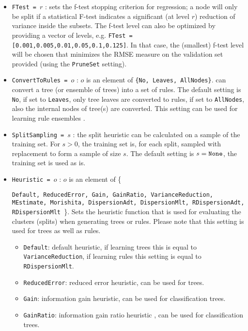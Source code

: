 \begin{itemize}
	\item {\tt FTest = $r$} : sets the f-test stopping criterion for regression; a node will only be split if a statistical F-test indicates a significant (at level $r$) reduction of variance inside the subsets. The f-test level can also be optimized by providing a vector of levels, e.g. {\tt FTest = [0.001,0.005,0.01,0.05,0.1,0.125]}. In that case, the (smallest) f-test level will be chosen that minimizes the RMSE measure on the validation set provided (using the {\tt PruneSet} setting).
	\item {\tt ConvertToRules = $o$} : $o$ is an element of \texttt{\{No, Leaves, AllNodes\}}. \clus{} can convert a tree (or ensemble of trees) into a set of rules. The default setting is \texttt{No}, if set to \texttt{Leaves}, only tree leaves are converted to rules, if set to \texttt{AllNodes}, also the internal nodes of tree(s) are converted. This setting can be used for learning rule ensembles \cite{Aho2009}.
	\item {\tt SplitSampling = $s$} : the split heuristic can be calculated on a sample of the training set. For $s > 0$, the training set is, for each split, sampled with replacement to form a sample of size $s$. The default setting is $s = {\tt None}$, the training set is used as is. 
	\item \texttt{Heuristic = $o$} : $o$ is an element of \{\raggedright\texttt{Default, ReducedError, Gain, GainRatio, %
		VarianceReduction, MEstimate, Morishita, DispersionAdt, DispersionMlt, RDispersionAdt, RDispersionMlt%
	}\}. Sets the heuristic function that is used for evaluating the clusters (splits) when generating trees or rules. Please note that this setting is used for trees as well as rules.
	\begin{itemize}
		\item \texttt{Default}: default heuristic, if learning trees this is equal to \texttt{VarianceReduction}, if learning rules this setting is equal to \texttt{RDispersionMlt}.
		\item \texttt{ReducedError}: reduced error heuristic, can be used for trees.
		\item \texttt{Gain}: information gain heuristic, can be used for classification trees.
		\item \texttt{GainRatio}: information gain ratio heuristic \cite{Quinlan1986}, can be used for classification trees.

\end{itemize}
\end{itemize}
